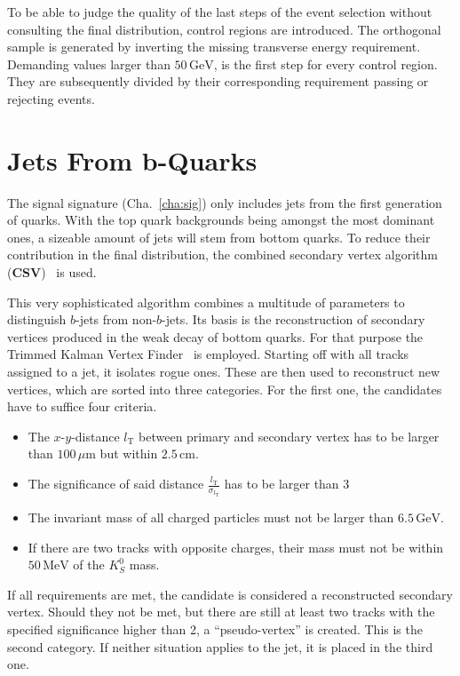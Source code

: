 To be able to judge the quality of the last steps of the event selection without consulting the final distribution, control regions are introduced. The orthogonal sample is generated by inverting the missing transverse energy requirement. Demanding values larger than $50\,\text{GeV}$, is the first step for every control region. They are subsequently divided by their corresponding requirement passing or rejecting events.


\section{Jets From b-Quarks}
\label{sec:bjets}

The signal signature (Cha.~\ref{cha:sig}) only includes jets from the first generation of quarks. With the top quark backgrounds being amongst the most dominant ones, a sizeable amount of jets will stem from bottom quarks. To reduce their contribution in the final distribution, the combined secondary vertex algorithm (\textbf{CSV})~\cite{csvbtag} is used. 

This very sophisticated algorithm combines a multitude of parameters to distinguish $b$-jets from non-$b$-jets. Its basis is the reconstruction of secondary vertices produced in the weak decay of bottom quarks. For that purpose the Trimmed Kalman Vertex Finder~\cite{kalmanvtx} is employed. Starting off with all tracks assigned to a jet, it isolates rogue ones. These are then used to reconstruct new vertices, which are sorted into three categories. For the first one, the candidates have to suffice four criteria.

\begin{itemize}
\item The $x$-$y$-distance $l_{\text{T}}$ between primary and secondary vertex has to be larger than $100\,\mu\text{m}$ but within $2.5\,\text{cm}$.
\item The significance of said distance $\frac{l_{\text{T}}}{\sigma_{l_{\text{T}}}}$ has to be larger than $3$
\item The invariant mass of all charged particles must not be larger than $6.5\,\text{GeV}$.
\item If there are two tracks with opposite charges, their mass must not be within $50\,\text{MeV}$ of the $K^0_S$ mass.
\end{itemize}

\noindent If all requirements are met, the candidate is considered a reconstructed secondary vertex. Should they not be met, but there are still at least two tracks with the specified significance higher than 2, a ``pseudo-vertex'' is created. This is the second category. If neither situation applies to the jet, it is placed in the third one.

